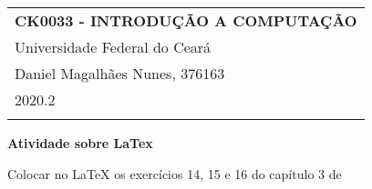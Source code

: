 \documentclass[a4paper,12pt]{article} %
\begin{document}
	
	
	\thispagestyle{empty} %
	
	\begin{tabular}{p{15.5cm}} %
		{\large \bf CK0033 - INTRODUÇÃO A COMPUTAÇÃO} \\
		 Universidade Federal do Ceará \\ 
		 Daniel Magalhães Nunes, 376163 \\ 2020.2 \\
		\hline %
		\\
	\end{tabular} %
	
	\vspace*{0.3cm} %
	
	\begin{center} %
		{\Large \bf Atividade sobre LaTex} %
		\vspace{2mm}
		
	\end{center}  
	
	\vspace{0.4cm}
	
	
	Colocar no LaTeX os exercícios 14, 15 e 16 do capítulo 3 de \cite{MorettinBussab2005}
	
\end{document}
